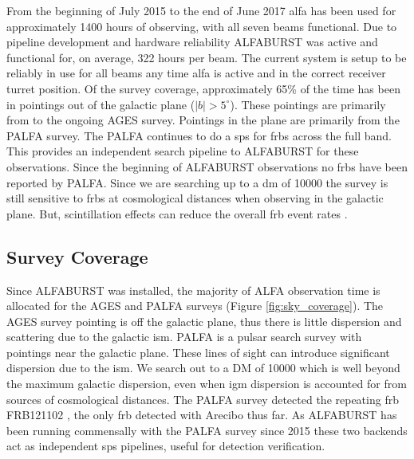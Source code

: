\documentclass[a4paper,fleqn,usenatbib]{mnras}
\begin{document}
From the beginning of July 2015 to the end of June 2017 \gls*{alfa} has been
used for approximately 1400 hours of observing, with all seven beams functional.
Due to pipeline development and hardware reliability ALFABURST was active and
functional for, on average, 322 hours per beam.  The current system is setup to
be reliably in use for all beams any time \gls*{alfa} is active and in the
correct receiver turret position. Of the survey coverage, approximately 65\% of
the time has been in pointings out of the galactic plane ($|b| > 5^{\circ}$).
These pointings are primarily from to the ongoing AGES survey.  Pointings in the
plane are primarily from the PALFA survey. The PALFA continues to do a \gls{sps}
for \glspl{frb} across the full band. This provides an independent search
pipeline to ALFABURST for these observations. Since the beginning of ALFABURST
observations no \glspl{frb} have been reported by PALFA.  Since we are searching
up to a \gls{dm} of 10000 the survey is still sensitive to \glspl{frb} at
cosmological distances when observing in the galactic plane. But, scintillation
effects can reduce the overall \gls{frb} event rates
\citep{2015MNRAS.451.3278M}.



\subsection{Survey Coverage}
\label{sec:survey_coverage}

Since ALFABURST was installed, the majority of ALFA observation time is
allocated for the AGES \citep{2006MNRAS.371.1617A} and PALFA
\citep{2006ApJ...637..446C} surveys (Figure \ref{fig:sky_coverage}).  The AGES
survey pointing is off the galactic plane, thus there is little dispersion and
scattering due to the galactic \gls*{ism}. PALFA is a pulsar search survey with
pointings near the galactic plane. These lines of sight can introduce
significant dispersion due to the \gls*{ism}. We search out to a DM of 10000
which is well beyond the maximum galactic dispersion, even when \gls*{igm}
dispersion is accounted for from sources of cosmological distances. The PALFA
survey detected the repeating \gls{frb} FRB121102 \citep{2014ApJ...790..101S},
the only \gls{frb} detected with Arecibo thus far. As ALFABURST has been running
commensally with the PALFA survey since 2015 these two backends act as
independent \gls{sps} pipelines, useful for detection verification.
\end{document}
